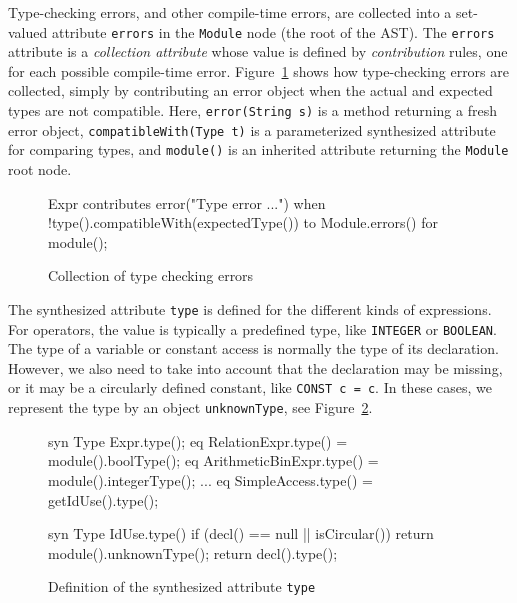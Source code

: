 Type-checking errors, and other compile-time errors, are collected into a set-valued attribute \texttt{errors} in the \texttt{Module} node (the root of the AST). The \texttt{errors} attribute is a \emph{collection attribute}  \cite{boyland98cc,magnusson09ase} whose value is defined by \emph{contribution} rules, one for each possible compile-time error. 
Figure~\ref{JA-TypeErrors} shows how type-checking errors are collected, simply by contributing an error object when the actual and expected types are not compatible. Here, \texttt{error(String s)} is a method returning a fresh error object, \texttt{compatibleWith(Type~t)} is a parameterized synthesized attribute for comparing types, and \texttt{module()} is an inherited attribute returning the \texttt{Module} root node.

\begin{figure}[h]
\begin{jastaddcode}
Expr contributes error("Type error ...")
	when !type().compatibleWith(expectedType())
	to Module.errors() for module();
\end{jastaddcode}
\vspace{-15pt}
\caption{Collection of type checking errors}
\label{JA-TypeErrors}
\end{figure}

The synthesized attribute \texttt{type} is defined for the different kinds of expressions. For operators, the value is typically a predefined type, like \texttt{INTEGER} or \texttt{BOOLEAN}. The type of a variable or constant access is normally the type of its declaration. However, we also need to take into account that the declaration may be missing, or it may be a circularly defined constant, like \texttt{CONST c = c}. In these cases, we represent the type by an object \texttt{unknownType}, see Figure~\ref{JA-SimpleIdUse}. 

\begin{figure}
\begin{jastaddcode}
syn Type Expr.type();
eq RelationExpr.type() = module().boolType();
eq ArithmeticBinExpr.type() = module().integerType();
...
eq SimpleAccess.type() = getIdUse().type();

syn Type IdUse.type() {
	if (decl() == null || isCircular()) 
		return module().unknownType();
	return decl().type();
}
\end{jastaddcode}
\vspace{-15pt}
\caption{Definition of the synthesized attribute \texttt{type}}
\label{JA-SimpleIdUse}
\end{figure}

